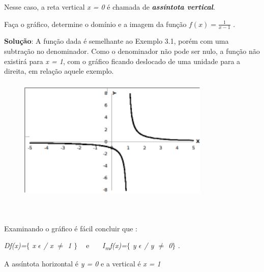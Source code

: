 Nesse caso, a reta vertical \textit{x = 0} é chamada de \textbf{\textit{assíntota vertical}}.

\begin{texemplo}
Faça o gráfico, determine o domínio e a imagem da função  \( f \left( x \right) =\frac{1}{x-1} \) .

\textbf{Solução}: A função dada é semelhante ao Exemplo 3.1, porém com uma subtração no denominador. Como o denominador não pode ser nulo, a função não existirá para \textit{x = 1}, com o gráfico ficando deslocado de uma unidade para a direita, em relação aquele exemplo.

\begin{figure}[H]
	\begin{Center}
		\includegraphics[width=3.6in,height=2.33in]{capitulos/outras_funcoes/media/image11.pdf}
	\end{Center}
\end{figure}

~~

\quad Examinando o gráfico é fácil concluir que : 

\textit{Df(x)=$ \{ $  x $ \epsilon $  \textbf{ }/ x $ \neq $  1\textbf{ }$ \} $ ~ } \quad e~~~  \textit{I\textsubscript{m}f(x)=$ \{ $ y $ \epsilon $   / y $ \neq $  0$ \} $  }. 

A assíntota horizontal é \textit{y = 0} e a vertical é \textit{x = 1}~~ \qedsymbol{} 
\end{texemplo}

